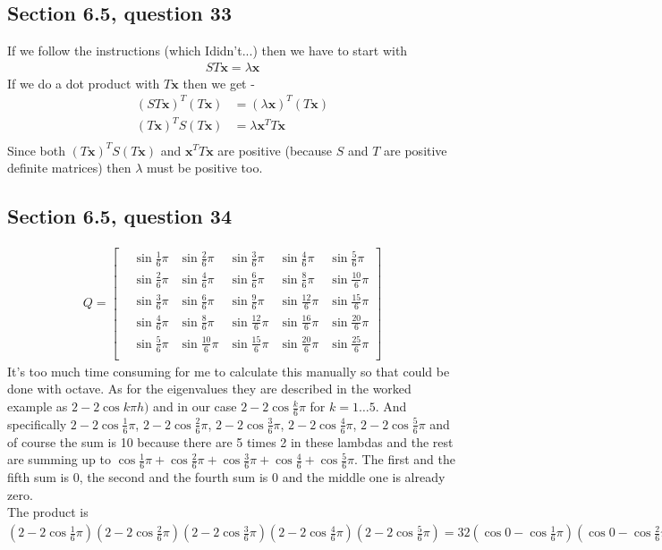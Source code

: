 \documentclass[a4paper,11pt]{article}
\newcommand{\mybf}[1]{\boldsymbol{#1}}
\newcommand{\?}{\stackrel{?}{=}}
\begin{document}
\subsection*{Section 6.5, question 33}
If we follow the instructions (which Ididn't...) then we have to start with
\begin{align*}
ST\mybf{x}=\lambda\mybf{x}
\end{align*}
If we do a dot product with $T\mybf{x}$ then we get - 
\begin{align*}
(ST\mybf{x})^T(T\mybf{x})&= (\lambda\mybf{x})^T(T\mybf{x}) \\
(T\mybf{x})^T{S}(T\mybf{x})&= \lambda\mybf{x}^T{T\mybf{x}} \\
\end{align*}
Since both $(T\mybf{x})^T{S}(T\mybf{x})$ and $\mybf{x}^T{T\mybf{x}}$ are positive (because $S$ and $T$ are positive definite matrices) then $\lambda$ must be positive too.
\subsection*{Section 6.5, question 34}
\begin{align*}
Q =
\begin{bmatrix}
&\sin \frac{1}{6}\pi &\sin \frac{2}{6}\pi &\sin \frac{3}{6}\pi &\sin \frac{4}{6}\pi &\sin \frac{5}{6}\pi\\
&\sin \frac{2}{6}\pi &\sin \frac{4}{6}\pi &\sin \frac{6}{6}\pi &\sin \frac{8}{6}\pi &\sin \frac{10}{6}\pi\\
&\sin \frac{3}{6}\pi &\sin \frac{6}{6}\pi &\sin \frac{9}{6}\pi &\sin \frac{12}{6}\pi &\sin \frac{15}{6}\pi\\
&\sin \frac{4}{6}\pi &\sin \frac{8}{6}\pi &\sin \frac{12}{6}\pi &\sin \frac{16}{6}\pi &\sin \frac{20}{6}\pi\\
&\sin \frac{5}{6}\pi &\sin \frac{10}{6}\pi &\sin \frac{15}{6}\pi &\sin \frac{20}{6}\pi &\sin \frac{25}{6}\pi\\
\end{bmatrix}
\end{align*}
It's too much time consuming for me to calculate this manually so that could be done with octave.
As for the eigenvalues they are described in the worked example as $2-2 \cos k{\pi}h)$ and in our case $2-2 \cos \frac{k}{6}{\pi}$ for $k=1\dots5$. And specifically $2-2\cos \frac{1}{6}\pi$, $2-2\cos \frac{2}{6}\pi$,  $2-2\cos \frac{3}{6}\pi$, $2-2\cos \frac{4}{6}\pi$, $2-2\cos \frac{5}{6}\pi$ and of course the sum is 10 because there are 5 times 2 in these lambdas and the rest are summing up to $\cos \frac{1}{6}\pi + \cos \frac{2}{6}\pi + \cos \frac{3}{6}\pi + \cos \frac{4}{6} + \cos \frac{5}{6}\pi$. The first and the fifth sum is 0, the second and the fourth sum is 0 and the middle one is already zero.\\
The product is $(2-2\cos \frac{1}{6}\pi)(2-2\cos \frac{2}{6}\pi)(2-2\cos \frac{3}{6}\pi)(2-2\cos \frac{4}{6}\pi)(2-2\cos \frac{5}{6}\pi) = 32(\cos 0 -\cos \frac{1}{6}\pi)(\cos 0-\cos \frac{2}{6}\pi)(\cos 0-\cos \frac{3}{6}\pi)(\cos 0-\cos \frac{4}{6}\pi)(\cos 0-\cos \frac{5}{6}\pi) = 32(2\sin^2 \frac{1}{12}\pi)(2\sin^2 \frac{2}{12}\pi)(2\sin^2 \frac{3}{12}\pi)(2\sin^2\frac{4}{12}\pi)(2\sin^2\frac{5}{12}\pi)=1024*(\sin\frac{1}{12}\pi\sin\frac{2}{12}\pi\sin\frac{3}{12}\pi\sin\frac{4}{12}\pi\sin\frac{5}{12}\pi)^2=6$
\end{document}
